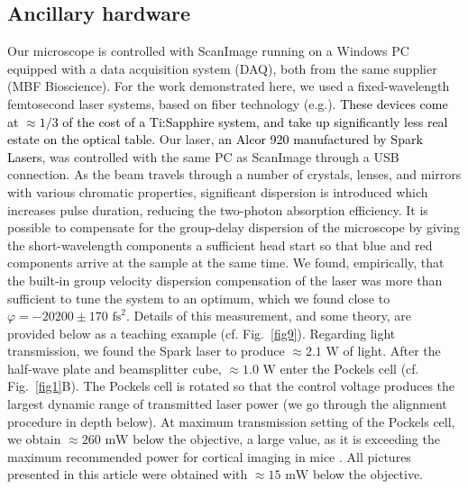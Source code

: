 \documentclass[10pt,letterpaper]{article}
\begin{document}
\subsection*{Ancillary hardware}
Our microscope is controlled with ScanImage \cite{Pologruto2003} running on a Windows PC equipped with a data acquisition system (DAQ), both from the same supplier (MBF Bioscience). For the work demonstrated here, we used a fixed-wavelength femtosecond laser systems, based on fiber technology (e.g.\cite{Bueno2019,Limpert2006,Wise2012,Young2015}). \textcolor{black}{These devices come at $\approx 1/3$ of the cost of a Ti:Sapphire system, and take up significantly less real estate on the optical table.} Our laser, \textcolor{black}{an Alcor 920 manufactured by Spark Lasers}, was controlled with the same PC as ScanImage through a USB connection. As the beam travels through a number of crystals, lenses, and mirrors with various chromatic properties, significant dispersion is introduced which increases pulse duration, reducing the two-photon absorption efficiency. It is possible to compensate for the group-delay dispersion of the microscope by giving the short-wavelength components a sufficient head start so that blue and red components arrive at the sample at the same time. We found, empirically, that the built-in group velocity dispersion compensation of the laser was more than sufficient to tune the system to an optimum, which we found close to $\varphi=-20200\pm170\text{ fs}^2$. Details of this measurement, and some theory, are provided below as a teaching example (cf. Fig.~\ref{fig9}). Regarding light transmission, we found the Spark laser to produce $\approx 2.1\text{ W}$ of light. After the half-wave plate and beamsplitter cube, $\approx 1.0\text{ W}$ enter the Pockels cell (cf. Fig.~\ref{fig1}B). The Pockels cell is rotated so that the control voltage produces the largest dynamic range of transmitted laser power (we go through the alignment procedure in depth below). At maximum transmission setting of the Pockels cell, we obtain $\approx 260\text{ mW}$ below the objective, a large value, as it is exceeding the maximum recommended power for cortical imaging in mice \cite{Song2017}. All pictures presented in this article were obtained with $\approx 15\text{ mW}$ below the objective.
\end{document}
